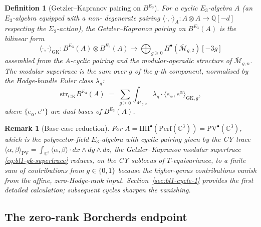 \documentclass[11pt]{article}
\newtheorem{definition}[theorem]{Definition}
\newtheorem{remark}[theorem]{Remark}
\providecommand{\HH}{\mathrm{HH}}
\providecommand{\Perf}{\mathrm{Perf}}
\providecommand{\PV}{\mathrm{PV}}
\providecommand{\PVbullet}{\mathrm{PV}^{\bullet}}
\providecommand{\C}{\mathbb{C}}
\providecommand{\QQ}{\mathbb{Q}}
\providecommand{\Mbar}{\overline{\mathcal M}}
\providecommand{\str}{\mathrm{str}}
\providecommand{\pair}[2]{\langle #1, #2 \rangle}
\begin{document}
\begin{definition}[Getzler--Kapranov pairing on $B^{E_3}$]
\label{def:bl1-gk-e3}
For a cyclic $E_3$-algebra $A$ (an $E_3$-algebra equipped with a non-
degenerate pairing $\pair{\cdot}{\cdot}_A : A \otimes A \to \QQ[-d]$
respecting the $\Sigma_2$-action), the Getzler--Kapranov pairing on
$B^{E_3}(A)$ is the bilinear form
\begin{equation}
  \pair{\cdot}{\cdot}_{\mathrm{GK}}
  : B^{E_3}(A) \otimes B^{E_3}(A)
  \longrightarrow \bigoplus_{g \geq 0} H^\bullet(\Mbar_{g, 2})[-3g]
\end{equation}
assembled from the $A$-cyclic pairing and the modular-operadic structure
of $\Mbar_{g, n}$. The \emph{modular supertrace} is the sum over $g$
of the $g$-th component, normalised by the Hodge-bundle Euler class
$\lambda_g$:
\begin{equation}
\label{eq:bl1-gk-supertrace}
  \str_{\mathrm{GK}} B^{E_3}(A)
  \;=\; \sum_{g \geq 0} \int_{\Mbar_{g, 2}}
  \lambda_g \cdot \pair{e_\alpha}{e^\alpha}_{\mathrm{GK}, g},
\end{equation}
where $\{e_\alpha, e^\alpha\}$ are dual bases of $B^{E_3}(A)$.
\end{definition}

\begin{remark}[Base-case reduction]
\label{rem:bl1-base-case-reduction}
For $A = \HH^\bullet(\Perf(\C^3)) = \PVbullet(\C^3)$, which is the
polyvector-field $E_3$-algebra with cyclic pairing given by the CY
trace $\pair{\alpha}{\beta}_{\PV} = \int_{\C^3}
\langle \alpha, \beta \rangle \cdot dx \wedge dy \wedge dz$, the
Getzler--Kapranov modular supertrace \eqref{eq:bl1-gk-supertrace}
reduces, on the CY sublocus of $T$-equivariance, to a finite sum of
contributions from $g \in \{0, 1\}$ because the higher-genus
contributions vanish from the affine, zero-Hodge-rank input.
Section~\ref{sec:bl1-cycle-1} provides the first detailed calculation;
subsequent cycles sharpen the vanishing.
\end{remark}

\subsection{The zero-rank Borcherds endpoint}
\label{subsec:bl1-borcherds-normalisation}
\end{document}
